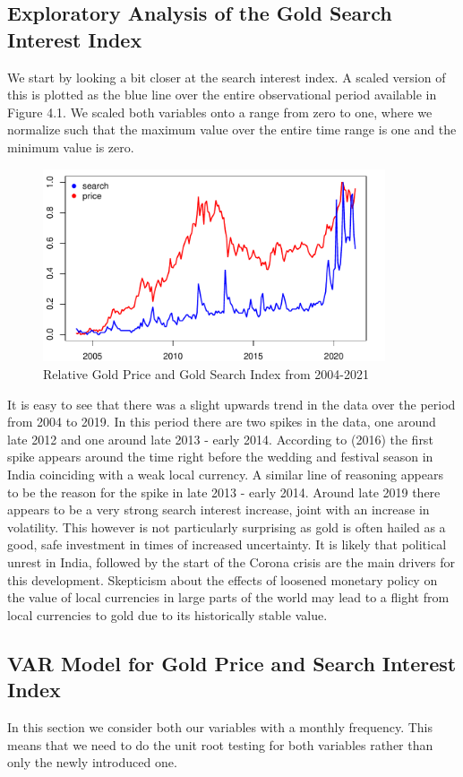 \documentclass[a4paper]{article}
\theoremstyle{definition}
\begin{document}
\subsection{Exploratory Analysis of the Gold Search Interest Index}
We start by looking a bit closer at the search interest index. A scaled version of this is plotted as the blue line over the entire observational period available in Figure 4.1. We scaled both variables onto a range from zero to one, where we normalize such that the maximum value over the entire time range is one and the minimum value is zero.
	\begin{figure}[!t]
	\centering
	\caption{Relative Gold Price and Gold Search Index from 2004-2021}
	\includegraphics[width=0.90\textwidth]{comparisonPriceSearch}
	\end{figure}
It is easy to see that there was a slight upwards trend in the data over the period from 2004 to 2019. In this period there are two spikes in the data, one around late 2012 and one around late 2013 - early 2014. According to \citeauthor{Desk.24062016} (2016) the first spike appears around the time right before the wedding and festival season in India coinciding with a weak local currency. A similar line of reasoning appears to be the reason for the spike in late 2013 - early 2014. Around late 2019 there appears to be a very strong search interest increase, joint with an increase in volatility. This however is not particularly surprising as gold is often hailed as a good, safe investment in times of increased uncertainty. It is likely that political unrest in India, followed by the start of the Corona crisis are the main drivers for this development. Skepticism about the effects of loosened monetary policy on the value of local currencies in large parts of the world may lead to a flight from local currencies to gold due to its historically stable value. 
%
\subsection{VAR Model for Gold Price and Search Interest Index}
In this section we consider both our variables with a monthly frequency. This means that we need to do the unit root testing for both variables rather than only the newly introduced one. 
\end{document}
